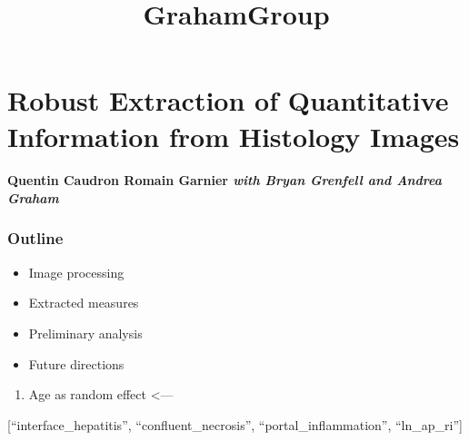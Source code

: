 \documentclass{article}
\title{GrahamGroup}
\begin{document}
    
    
    \maketitle
    
    

    

    \section{Robust Extraction of Quantitative Information from Histology Images}



    \paragraph{Quentin Caudron Romain Garnier \emph{with Bryan Grenfell and Andrea
Graham}}



    \subsubsection{Outline}


    \begin{itemize}
\itemsep1pt\parskip0pt
\item
  Image processing
\item
  Extracted measures
\item
  Preliminary analysis
\item
  Future directions
\end{itemize}

    \begin{enumerate}
\def\labelenumi{\arabic{enumi}.}
\setcounter{enumi}{3}
\itemsep1pt\parskip0pt
\item
  Age as random effect \textless{}---
\end{enumerate}

{[}``interface\_hepatitis'', ``confluent\_necrosis'',
``portal\_inflammation'', ``ln\_ap\_ri''{]}
\end{document}
